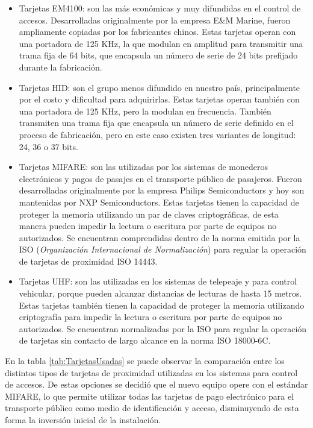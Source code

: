 \begin{itemize}
	\item Tarjetas EM4100: son las más económicas y muy difundidas en el control de accesos. Desarrolladas originalmente por la empresa E\&M Marine, fueron ampliamente copiadas por los fabricantes chinos. Estas tarjetas operan con una portadora de 125 KHz, la que modulan en amplitud para transmitir una trama fija de 64 bits, que encapsula un número de serie de 24 bits prefijado durante la fabricación.
	
	\item Tarjetas HID: son el grupo menos difundido en nuestro país, principalmente por el costo y dificultad para adquirirlas. Estas tarjetas operan también con una portadora de 125 KHz, pero la modulan en frecuencia. También transmiten una trama fija que encapsula un número de serie definido en el proceso de fabricación, pero en este caso existen tres variantes de longitud: 24, 36 o 37 bits.
	
	\item Tarjetas MIFARE: son las utilizadas por los sistemas de monederos electrónicos y pagos de pasajes en el transporte público de pasajeros. Fueron desarrolladas originalmente por la empresa Philips Semiconductors y hoy son mantenidas por NXP Semiconductors. Estas tarjetas tienen la capacidad de proteger la memoria utilizando un par de claves criptográficas, de esta manera pueden impedir la lectura o escritura por parte de equipos no autorizados. Se encuentran comprendidas dentro de la norma emitida por la ISO (\emph{Organización Internacional de Normalización}) para regular la operación de tarjetas de proximidad ISO 14443.
	
	\item Tarjetas UHF: son las utilizadas en los sistemas de telepeaje y para control vehicular, porque pueden alcanzar distancias de lecturas de hasta 15 metros. Estas tarjetas también tienen la capacidad de proteger la memoria utilizando criptografía para impedir la lectura o escritura por parte de equipos no autorizados. Se encuentran normalizadas por la ISO para regular la operación de tarjetas sin contacto de largo alcance en la norma ISO 18000-6C.
\end{itemize}

En la tabla \ref{tab:TarjetasUsadas} se puede observar la comparación entre los distintos tipos de tarjetas de proximidad utilizadas en los sistemas para control de accesos. De estas opciones se decidió que el nuevo equipo opere con el estándar MIFARE, lo que permite utilizar todas las tarjetas de pago electrónico para el transporte público como medio de identificación y acceso, disminuyendo de esta forma la inversión inicial de la instalación.

